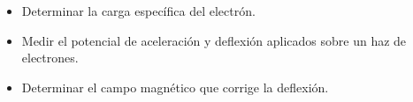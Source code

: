 \begin{itemize}
    \item Determinar la carga específica del electrón.
    \item Medir el potencial de aceleración y deflexión aplicados sobre un haz de electrones.
    \item Determinar el campo magnético que corrige la deflexión.
\end{itemize}

